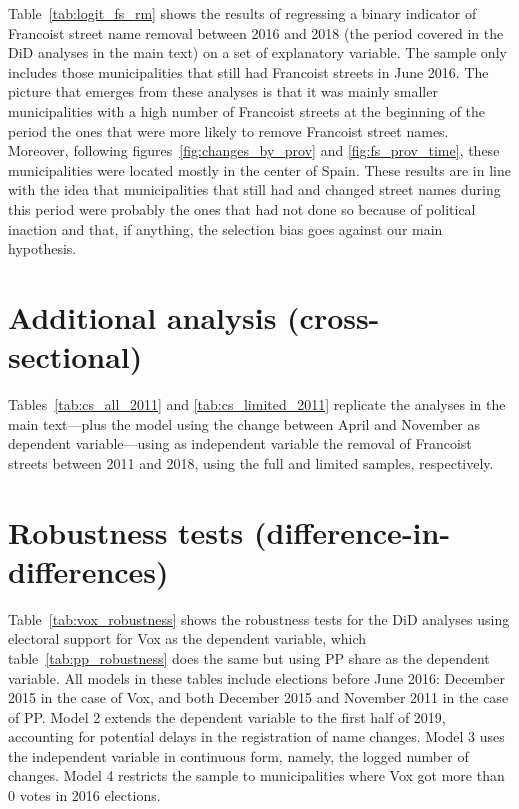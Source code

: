 \documentclass[12pt, titlepage]{article}
\begin{document}
Table~\ref{tab:logit_fs_rm} shows the results of regressing a binary indicator of Francoist street name removal between 2016 and 2018 (the period covered in the DiD analyses in the main text) on a set of explanatory variable.
The sample only includes those municipalities that still had Francoist streets in June 2016.
The picture that emerges from these analyses is that it was mainly smaller municipalities with a high number of Francoist streets at the beginning of the period the ones that were more likely to remove Francoist street names.
Moreover, following figures~\ref{fig:changes_by_prov} and \ref{fig:fs_prov_time}, these municipalities were located mostly in the center of Spain.
These results are in line with the idea that municipalities that still had and changed street names during this period were probably the ones that had not done so because of political inaction and that, if anything, the selection bias goes against our main hypothesis.








\section{Additional analysis (cross-sectional)}



Tables~\ref{tab:cs_all_2011} and \ref{tab:cs_limited_2011} replicate the analyses in the main text---plus the model using the change between April and November as dependent variable---using as independent variable the removal of Francoist streets between 2011 and 2018, using the full and limited samples, respectively.




\section{Robustness tests (difference-in-differences)}

Table~\ref{tab:vox_robustness} shows the robustness tests for the DiD analyses using electoral support for Vox as the dependent variable, which table~\ref{tab:pp_robustness} does the same but using PP share as the dependent variable.
All models in these tables include elections before June 2016: December 2015 in the case of Vox, and both December 2015 and November 2011 in the case of PP.
Model 2 extends the dependent variable to the first half of 2019, accounting for potential delays in the registration of name changes.
Model 3 uses the independent variable in continuous form, namely, the logged number of changes.
Model 4 restricts the sample to municipalities where Vox got more than 0 votes in 2016 elections.




\end{document}

